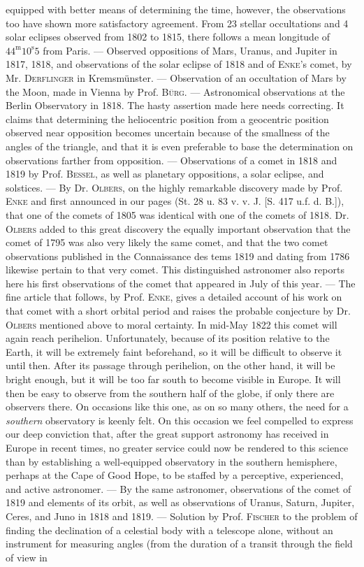 equipped with better means of determining the time, however, the observations too have shown more satisfactory agreement. From 23 stellar occultations and 4 solar eclipses observed from 1802 to 1815, there follows a mean longitude of $44^{\mathrm{m}}10^{\mathrm{s}}5$ from Paris. --- Observed oppositions of Mars, Uranus, and Jupiter in 1817, 1818, and observations of the solar eclipse of 1818 and of \textsc{Enke}'s comet, by Mr. \textsc{Derflinger} in Kremsmünster. --- Observation of an occultation of Mars by the Moon, made in Vienna by Prof. \textsc{Bürg}. --- Astronomical observations at the Berlin Observatory in 1818. The hasty assertion made here needs correcting. It claims that determining the heliocentric position from a geocentric position observed near opposition becomes uncertain because of the smallness of the angles of the triangle, and that it is even preferable to base the determination on observations farther from opposition. --- Observations of a comet in 1818 and 1819 by Prof. \textsc{Bessel}, as well as planetary oppositions, a solar eclipse, and solstices. --- By Dr. \textsc{Olbers}, on the highly remarkable discovery  made by Prof. \textsc{Enke} and first announced in our pages (St. 28 u. 83 v. v. J. [S. 417 u.f. d. B.]), that one of the comets of 1805 was identical with one of the comets of 1818. Dr. \textsc{Olbers} added to this great discovery the equally important observation that the comet of 1795 was also very likely the same comet, and that the two comet observations published in the Connaissance des tems 1819 and dating from 1786 likewise pertain to that very comet. This distinguished astronomer also reports here his first observations of the comet that appeared in July of this year. --- The fine article that follows, by Prof. \textsc{Enke}, gives a detailed account of his work on that comet with a short orbital period and raises the probable conjecture by Dr. \textsc{Olbers} mentioned above to moral certainty. In mid-May 1822 this comet will again reach perihelion. Unfortunately, because of its position relative to the Earth, it will be extremely faint beforehand, so it will be difficult to observe it until then. After its passage through perihelion, on the other hand, it will be bright enough, but it will be too far south to become visible in Europe. It will then be easy to observe from the southern half of the globe, if only there are observers there. On occasions like this one, as on so many others, the need for a \emph{southern} observatory is keenly felt. On this occasion we feel compelled to express our deep conviction that, after the great support astronomy has received in Europe in recent times, no greater service could now be rendered to this science than by establishing a well-equipped observatory in the southern hemisphere, perhaps at the Cape of Good Hope, to be staffed by a perceptive, experienced, and active astronomer. --- By the same astronomer, observations of the comet of 1819 and elements of its orbit, as well as observations of Uranus, Saturn, Jupiter, Ceres, and Juno in 1818 and 1819. --- Solution by Prof. \textsc{Fischer} to the problem of finding the declination of a celestial body with a telescope alone, without an instrument for measuring angles (from the duration of a transit through the field of view in 